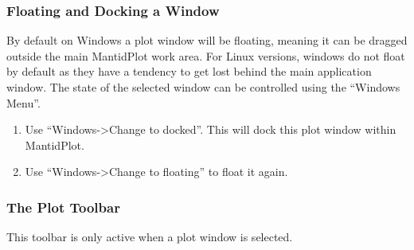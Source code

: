 \documentclass[letterpaper,10pt,english,openany]{sphinxmanual}
\begin{document}
\subsubsection{Floating and Docking a Window}
\label{\detokenize{mantid_basic_course/loading_and_displaying_data/06_formatting_plots:floating-and-docking-a-window}}
By default on Windows a plot window will be floating, meaning it can be
dragged outside the main MantidPlot work area. For Linux versions,
windows do not float by default as they have a tendency to get lost
behind the main application window. The state of the selected window can
be controlled using the “Windows Menu”.
\begin{enumerate}
\def\theenumi{\arabic{enumi}}
\def\labelenumi{\theenumi .}
\makeatletter\def\p@enumii{\p@enumi \theenumi .}\makeatother
\item {} 
Use “Windows-\textgreater{}Change to docked”. This will dock this plot window
within MantidPlot.

\item {} 
Use “Windows-\textgreater{}Change to floating” to float it again.

\end{enumerate}


\subsubsection{The Plot Toolbar}
\label{\detokenize{mantid_basic_course/loading_and_displaying_data/06_formatting_plots:the-plot-toolbar}}
This toolbar is only active when a plot window is selected.

\begin{figure}[H]
\centering

\noindent{}
\end{figure}
\end{document}
